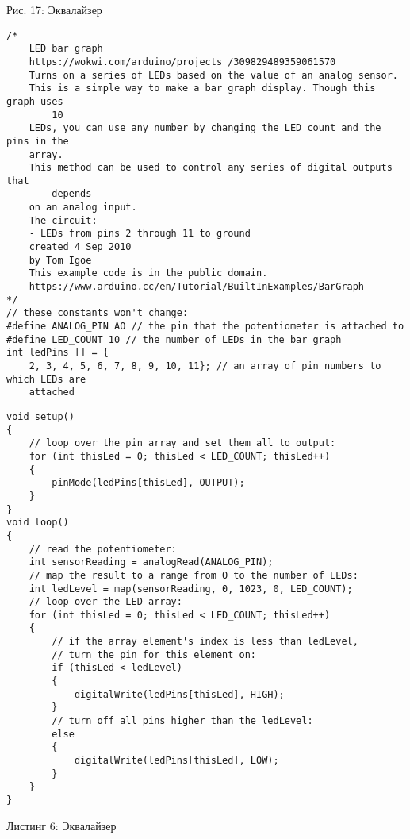 \documentclass[10pt]{article}
\begin{document}
Рис. 17: Эквалайзер

\begin{verbatim}
/*
    LED bar graph
    https://wokwi.com/arduino/projects /309829489359061570
    Turns on a series of LEDs based on the value of an analog sensor.
    This is a simple way to make a bar graph display. Though this graph uses
        10
    LEDs, you can use any number by changing the LED count and the pins in the
    array.
    This method can be used to control any series of digital outputs that
        depends
    on an analog input.
    The circuit:
    - LEDs from pins 2 through 11 to ground
    created 4 Sep 2010
    by Tom Igoe
    This example code is in the public domain.
    https://www.arduino.cc/en/Tutorial/BuiltInExamples/BarGraph
*/
// these constants won't change:
#define ANALOG_PIN AO // the pin that the potentiometer is attached to
#define LED_COUNT 10 // the number of LEDs in the bar graph
int ledPins [] = {
    2, 3, 4, 5, 6, 7, 8, 9, 10, 11}; // an array of pin numbers to which LEDs are
    attached
\end{verbatim}

\begin{verbatim}
void setup()
{
    // loop over the pin array and set them all to output:
    for (int thisLed = 0; thisLed < LED_COUNT; thisLed++)
    {
        pinMode(ledPins[thisLed], OUTPUT);
    }
}
void loop()
{
    // read the potentiometer:
    int sensorReading = analogRead(ANALOG_PIN);
    // map the result to a range from O to the number of LEDs:
    int ledLevel = map(sensorReading, 0, 1023, 0, LED_COUNT);
    // loop over the LED array:
    for (int thisLed = 0; thisLed < LED_COUNT; thisLed++)
    {
        // if the array element's index is less than ledLevel,
        // turn the pin for this element on:
        if (thisLed < ledLevel)
        {
            digitalWrite(ledPins[thisLed], HIGH);
        }
        // turn off all pins higher than the ledLevel:
        else
        {
            digitalWrite(ledPins[thisLed], LOW);
        }
    }
}
\end{verbatim}

Листинг 6: Эквалайзер
\end{document}
